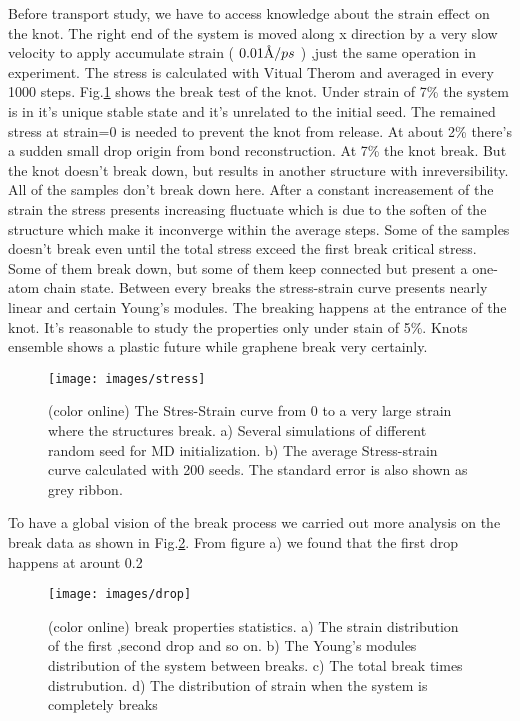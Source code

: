 \documentclass[%
 reprint,
 amsmath,amssymb,
 aps,
prb,
]{revtex4-1}
\newcommand{\angstrom}{\mbox{\normalfont\AA}}
\begin{document}
Before transport study, we have to access knowledge about the strain effect on the knot. The right end of the system is moved along x direction by a very slow velocity to apply accumulate strain ( $0.01 \angstrom / ps$ ) ,just the same operation in experiment. The stress is calculated with Vitual Therom and averaged in every 1000 steps. Fig.\ref{fig:stress} shows the break test of the knot. Under strain of 7\% the system is in it's unique stable state and it's unrelated to the initial seed. The remained stress at strain=0 is needed to prevent  the knot from release. At about 2\% there's a sudden small drop origin from bond reconstruction. At 7\% the knot break. But the knot doesn't break down, but results in another structure with inreversibility. All of the samples don't break down here. After a constant increasement of the strain the stress presents increasing fluctuate which is due to the soften of the structure which make it inconverge within the average steps. Some of the samples doesn't break even until the total stress exceed the first break critical stress. Some of them break down, but some of them keep connected but present a one-atom chain state. Between every breaks the stress-strain curve presents nearly linear and certain Young's modules.
The breaking happens at the entrance of the knot.
It's reasonable to study the properties only under stain of 5\%.
Knots ensemble shows a plastic future while graphene break very certainly.
\begin{figure}[b]
  \texttt{[image: images/stress]}
  \caption{\label{fig:stress}  (color online) The Stres-Strain curve from 0 to a very large strain where the structures break. a) Several simulations of different random seed for MD initialization. b) The average Stress-strain curve calculated with 200 seeds. The standard error is also shown as grey ribbon.}
\end{figure}

To have a global vision of the break process we carried out more analysis on the break data as shown in Fig.\ref{fig:drop}. From figure a) we found that the first drop happens at arount 0.2

\begin{figure}[b]
  \texttt{[image: images/drop]}
  \caption{\label{fig:drop}  (color online) break properties statistics. a) The strain distribution of the first ,second drop and so on. b) The Young's modules distribution of the system between breaks. c) The total break times distrubution. d) The distribution of strain when the system is completely breaks}
\end{figure}
\end{document}
